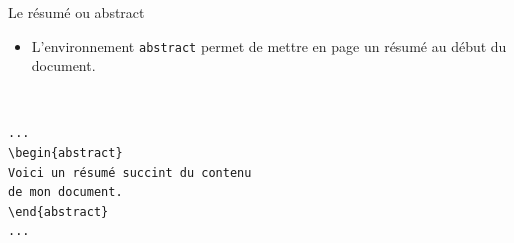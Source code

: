 \begin{frame}[fragile]{Le résumé ou abstract}
  \begin{itemize}
      \item L'environnement \lstinline|abstract| permet de mettre en page un résumé au début du document.
  \end{itemize}
  \begin{columns}
    \begin{column}{0.5\textwidth}
      \begin{lstlisting}[style=nonumbers]

...
\begin{abstract}
Voici un résumé succint du contenu
de mon document.
\end{abstract}
...

      \end{lstlisting}
    \end{column}
    \begin{column}{0.5\textwidth}
              \begin{abstract}
                  Voici un résumé succint du contenu de mon document.
              \end{abstract}
    \end{column}
  \end{columns}
\end{frame}

